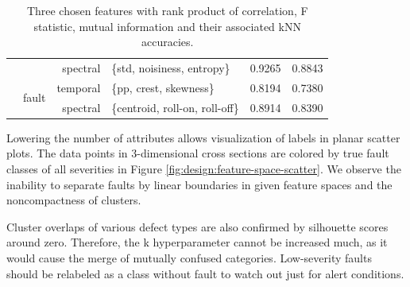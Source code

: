 \begin{table}[ht!]
\begin{adjustbox}{width=\textwidth}
\begin{tabular}{|r|r|r|l|r|r|}
                   &                                               & spectral        & \{std, noisiness, entropy\}       & 0.9265                                       & 0.8843                                      \\ \cline{2-6} 
                   & \multirow{2}{*}{fault}                        & temporal        & \{pp, crest, skewness\}           & 0.8194                                       & 0.7380                                      \\ \cline{3-6} 
                   &                                               & spectral        & \{centroid, roll-on, roll-off\} & 0.8914                                       & 0.8390                                      \\ \hline
\end{tabular}
\end{adjustbox}
\caption{Three chosen features with rank product of correlation, F statistic, mutual information and their associated kNN accuracies.}
\label{tab:design:best-3-features-knn}
\end{table}

Lowering the number of attributes allows visualization of labels in planar scatter plots. The data points in 3-dimensional cross sections are colored by true fault classes of all severities in Figure \ref{fig:design:feature-space-scatter}. We observe the inability to separate faults by linear boundaries in given feature spaces and the noncompactness of clusters. 

Cluster overlaps of various defect types are also confirmed by silhouette scores around zero. Therefore, the k hyperparameter cannot be increased much, as it would cause the merge of mutually confused categories. Low-severity faults should be relabeled as a class without fault to watch out just for alert conditions.


